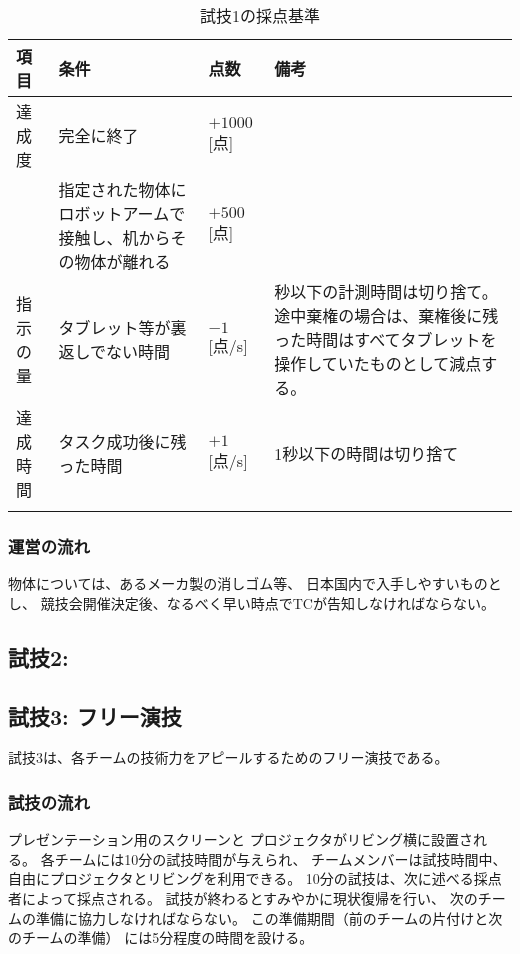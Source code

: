 \documentclass[a4j]{jarticle}
\def\thline{\noalign{\hrule height 1pt}}
\begin{document}
\begin{table}
\begin{center}
\caption{試技1の採点基準}
\label{table:test1score}
\begin{tabular}{l|p{5cm}|l|p{5cm}}
\thline
項目 & 条件 & 点数 & 備考\\
\hline
達成度 & 完全に終了 & $+1000$[点] \\
& 指定された物体にロボットアームで接触し、机からその物体が離れる & $+500$[点] \\
\hline
指示の量 & タブレット等が裏返しでない時間& $-1$[点/s] & 秒以下の計測時間は切り捨て。
途中棄権の場合は、棄権後に残った時間はすべてタブレットを操作していたものとして減点する。\\
\hline
達成時間 & タスク成功後に残った時間 & $+1$[点/s] & 1秒以下の時間は切り捨て\\
\thline
\end{tabular}
\end{center}
\end{table}



\subsubsection{運営の流れ}

物体については、あるメーカ製の消しゴム等、
日本国内で入手しやすいものとし、
競技会開催決定後、なるべく早い時点でTCが告知しなければならない。

\subsection{試技2: }

\subsection{試技3: フリー演技}

試技3は、各チームの技術力をアピールするためのフリー演技である。

\subsubsection{試技の流れ}

プレゼンテーション用のスクリーンと
プロジェクタがリビング横に設置される。
各チームには10分の試技時間が与えられ、
チームメンバーは試技時間中、
自由にプロジェクタとリビングを利用できる。
10分の試技は、次に述べる採点者によって採点される。
試技が終わるとすみやかに現状復帰を行い、
次のチームの準備に協力しなければならない。
この準備期間（前のチームの片付けと次のチームの準備）
には5分程度の時間を設ける。
\end{document}

